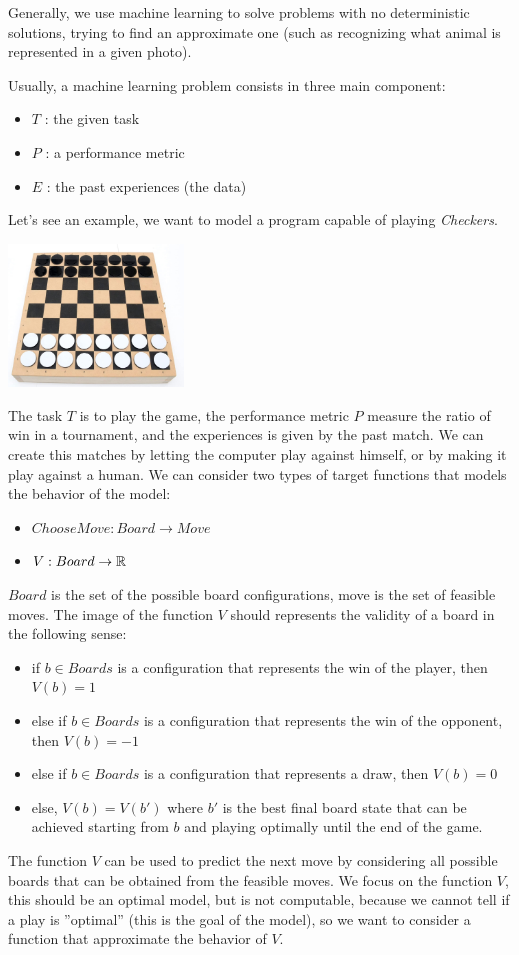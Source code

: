 \documentclass[10pt, letterpaper]{report}
\begin{document}
Generally, we use machine learning to solve problems with no deterministic solutions, trying to find an approximate one (such as recognizing what animal is represented in a given photo).\bigskip 

Usually, a machine learning problem consists in three main component:\begin{itemize}
    \item $T$ : the given task
    \item $P$ : a performance metric
    \item $E$ : the past experiences (the data)
\end{itemize}
Let's see an example, we want to model a program capable of playing \textit{Checkers}.
\begin{center}
    \includegraphics[width=0.35\textwidth]{images/Checkers.jpg}
\end{center}
The task $T$ is to play the game, the performance metric $P$ measure the ratio of win in a tournament, and the experiences is given by the past match. We can create this matches by letting the computer play against himself, or by making it play against a human. We can consider two types of target functions that models the behavior of the model:\begin{itemize}
    \item $ChooseMove : Board\rightarrow Move$
    \item $V : Board\rightarrow{\mathbb R}$
\end{itemize}
$Board$ is the set of the possible board configurations, move is the set of feasible moves. The image of the function $V$ should represents the validity of a board in the following sense:\begin{itemize}
    \item if $b\in Boards$ is a configuration that represents the win of the player, then $V(b)=1$
    \item else if $b\in Boards$ is a configuration that represents the win of the opponent, then $V(b)=-1$
    \item else if $b\in Boards$ is a configuration that represents a draw, then $V(b)=0$
    \item else, $V(b)=V(b')$ where $b'$ is
the best final board state that can be achieved starting from $b$ and
playing optimally until the end of the game.
\end{itemize}
The function $V$ can be used to predict the next move by considering all possible boards that can be obtained from the feasible moves.
We focus on the function $V$, this should be an optimal model, but is not computable, because we cannot tell if a play is ''optimal'' (this is the goal of the model), so we want to consider a function that approximate the behavior of $V$.\bigskip
\end{document}
